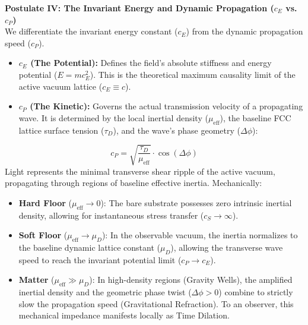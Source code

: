 \vspace{0.5em}
\noindent\textbf{Postulate IV: The Invariant Energy and Dynamic Propagation ($c_E$ vs. $c_P$)}\\
We differentiate the invariant energy constant ($c_E$) from the dynamic propagation speed ($c_P$).
\begin{itemize}
    \item \textbf{$c_E$ (The Potential):} Defines the field's absolute stiffness and energy potential ($E = mc_E^2$). This is the theoretical maximum causality limit of the active vacuum lattice ($c_E \equiv c$).
    \item \textbf{$c_P$ (The Kinetic):} Governs the actual transmission velocity of a propagating wave. It is determined by the local inertial density ($\mu_{\text{eff}}$), the baseline FCC lattice surface tension ($\tau_D$), and the wave's phase geometry ($\Delta\phi$):
\end{itemize}
\begin{equation}
    c_P = \sqrt{\frac{\tau_D}{\mu_{\text{eff}}}} \cdot \cos(\Delta\phi)
\end{equation}
Light represents the minimal transverse shear ripple of the active vacuum, propagating through regions of baseline effective inertia. Mechanically:
\begin{itemize}
    \item \textbf{Hard Floor} ($\mu_{\text{eff}} \to 0$): The bare substrate possesses zero intrinsic inertial density, allowing for instantaneous stress transfer ($c_S \to \infty$).
    \item \textbf{Soft Floor} ($\mu_{\text{eff}} \to \mu_D$): In the observable vacuum, the inertia normalizes to the baseline dynamic lattice constant ($\mu_D$), allowing the transverse wave speed to reach the invariant potential limit ($c_P \to c_E$).
    \item \textbf{Matter} ($\mu_{\text{eff}} \gg \mu_D$): In high-density regions (Gravity Wells), the amplified inertial density and the geometric phase twist ($\Delta\phi > 0$) combine to strictly slow the propagation speed (Gravitational Refraction). To an observer, this mechanical impedance manifests locally as Time Dilation.
\end{itemize}


